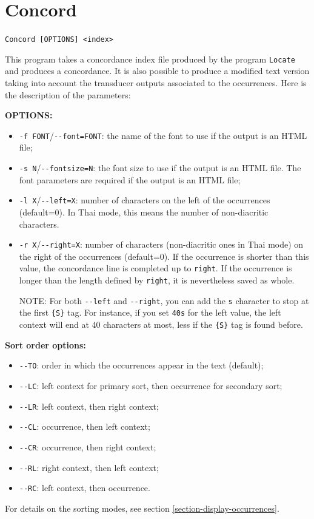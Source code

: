 \section{Concord}
\verb+Concord [OPTIONS] <index>+

\bigskip
\noindent This program takes a concordance index file produced by the program
\verb+Locate+ and produces a concordance. It is also possible to produce a
modified text version taking into account the transducer outputs associated to
the occurrences. Here is the description of the parameters:

\bigskip
\noindent \textbf{OPTIONS:}
\begin{itemize}
  \item \verb+-f FONT+/\verb+--font=FONT+: the name of the font to use if the
  output is an HTML file;
  \item \verb+-s N+/\verb+--fontsize=N+: the font size to use if the output is
  an HTML file. The font parameters are required if the output is an HTML file;
  \item \verb+-l X+/\verb+--left=X+: number of characters on the left of the 
  occurrences (default=0). In Thai mode, this means the number of non-diacritic
  characters.
  \item \verb+-r X+/\verb+--right=X+: number of characters (non-diacritic ones in Thai mode) on
  the right of the occurrences (default=0). If the occurrence is shorter than
  this value, the concordance line is completed up to \verb+right+. If the occurrence is longer
  than the length defined by \verb+right+, it is nevertheless saved as whole.
  
  \bigskip
  NOTE: For both \verb+--left+ and \verb+--right+, you can add the \verb+s+
  character to stop at the first \verb+{S}+ tag. For instance, if you
  set \verb+40s+ for the left value, the left context will end at 40 characters
  at most, less if the \verb+{S}+ tag is found before.
\end{itemize}

\bigskip
\noindent \textbf{Sort order options:}
\begin{itemize}
  \item \verb+--TO+: order in which the occurrences appear in the text
  (default);
  \item \verb+--LC+: left context for primary sort, then occurrence for
    secondary sort;
  \item \verb+--LR+: left context, then right context;
  \item \verb+--CL+: occurrence, then left context;
  \item \verb+--CR+: occurrence, then right context;
  \item \verb+--RL+: right context, then left context;
  \item \verb+--RC+: left context, then occurrence.
\end{itemize}
\noindent For details on the sorting modes, see section
\ref{section-display-occurrences}.

